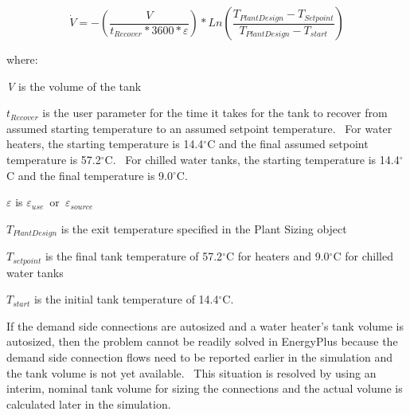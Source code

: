 \begin{equation}
\dot V =  - \left( \frac{V}{t_{Recover} * 3600 * \varepsilon } \right) * Ln\left( \frac{T_{PlantDesign} - T_{Setpoint}}{T_{PlantDesign} - T_{start}}  \right)
\end{equation}

where:

\emph{V} is the volume of the tank

\({t_{Recover}}\) is the user parameter for the time it takes for the tank to recover from assumed starting temperature to an assumed setpoint temperature.~ For water heaters, the starting temperature is 14.4\(^{\circ}\)C and the final assumed setpoint temperature is 57.2\(^{\circ}\)C.~ For chilled water tanks, the starting temperature is 14.4\(^{\circ}\)C and the final temperature is 9.0\(^{\circ}\)C.

\(\varepsilon\) is \({\varepsilon_{use}}\)~or~\({\varepsilon_{source}}\)

\({T_{PlantDesign}}\) is the exit temperature specified in the Plant Sizing object

\({T_{setpoint}}\) is the final tank temperature of 57.2\(^{\circ}\)C for heaters and 9.0\(^{\circ}\)C for chilled water tanks

\({T_{start}}\) is the initial tank temperature of 14.4\(^{\circ}\)C.

If the demand side connections are autosized and a water heater's tank volume is autosized, then the problem cannot be readily solved in EnergyPlus because the demand side connection flows need to be reported earlier in the simulation and the tank volume is not yet available.~ This situation is resolved by using an interim, nominal tank volume for sizing the connections and the actual volume is calculated later in the simulation.
